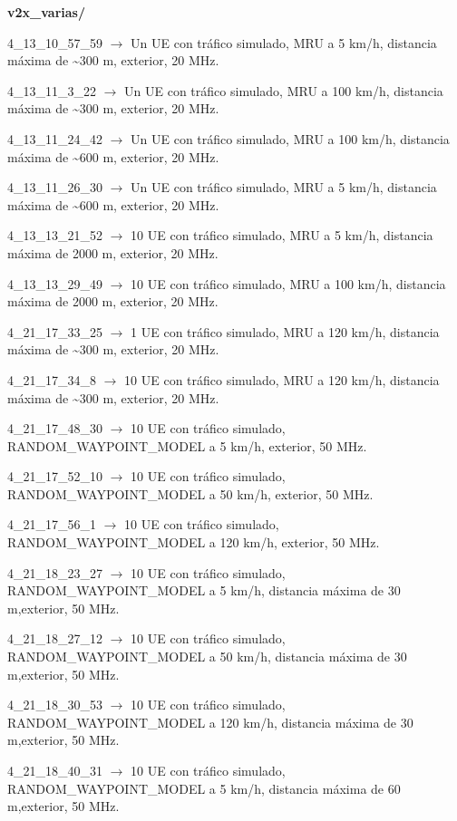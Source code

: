 \documentclass[12pt]{report} %
\begin{document}
\textbf{v2x\_varias/}

4\_13\_10\_57\_59 $\rightarrow$ Un UE con tráfico simulado, MRU a 5 km/h, distancia máxima de \textasciitilde300 m, exterior, 20 MHz.

4\_13\_11\_3\_22 $\rightarrow$ Un UE con tráfico simulado, MRU a 100 km/h, distancia máxima de \textasciitilde300 m, exterior, 20 MHz.

4\_13\_11\_24\_42 $\rightarrow$ Un UE con tráfico simulado, MRU a 100 km/h, distancia máxima de \textasciitilde600 m, exterior, 20 MHz.

4\_13\_11\_26\_30 $\rightarrow$ Un UE con tráfico simulado, MRU a 5 km/h, distancia máxima de \textasciitilde600 m, exterior, 20 MHz.

4\_13\_13\_21\_52 $\rightarrow$ 10 UE con tráfico simulado, MRU a 5 km/h, distancia máxima de 2000 m, exterior, 20 MHz.

4\_13\_13\_29\_49 $\rightarrow$ 10 UE con tráfico simulado, MRU a 100 km/h, distancia máxima de 2000 m, exterior, 20 MHz.

4\_21\_17\_33\_25 $\rightarrow$ 1 UE con tráfico simulado, MRU a 120 km/h, distancia máxima de \textasciitilde300 m, exterior, 20 MHz.

4\_21\_17\_34\_8 $\rightarrow$ 10 UE con tráfico simulado, MRU a 120 km/h, distancia máxima de \textasciitilde300 m, exterior, 20 MHz.

4\_21\_17\_48\_30 $\rightarrow$ 10 UE con tráfico simulado, RANDOM\_WAYPOINT\_MODEL a 5 km/h, exterior, 50 MHz.

4\_21\_17\_52\_10 $\rightarrow$ 10 UE con tráfico simulado, RANDOM\_WAYPOINT\_MODEL a 50 km/h, exterior, 50 MHz.

4\_21\_17\_56\_1 $\rightarrow$ 10 UE con tráfico simulado, RANDOM\_WAYPOINT\_MODEL a 120 km/h, exterior, 50 MHz.

4\_21\_18\_23\_27 $\rightarrow$ 10 UE con tráfico simulado, RANDOM\_WAYPOINT\_MODEL a 5 km/h, distancia máxima de 30 m,exterior, 50 MHz.

4\_21\_18\_27\_12 $\rightarrow$ 10 UE con tráfico simulado, RANDOM\_WAYPOINT\_MODEL a 50 km/h, distancia máxima de 30 m,exterior, 50 MHz.

4\_21\_18\_30\_53 $\rightarrow$ 10 UE con tráfico simulado, RANDOM\_WAYPOINT\_MODEL a 120 km/h, distancia máxima de 30 m,exterior, 50 MHz.

4\_21\_18\_40\_31 $\rightarrow$ 10 UE con tráfico simulado, RANDOM\_WAYPOINT\_MODEL a 5 km/h, distancia máxima de 60 m,exterior, 50 MHz.
\end{document}
